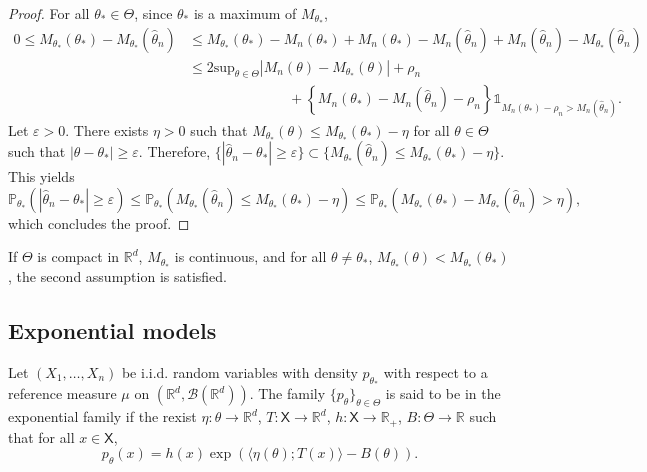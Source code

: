 \documentclass[english,graybox,envcountchap,envcountsame,sectrefs,shortlabels]{svmono}
\theoremstyle{style}
\newcommand{\eqsp}{}
\newcommand{\Xset}{\mathsf{X}}
\begin{document}
\begin{proof}
For all $\theta_*\in\Theta$, since $\theta_*$ is a maximum of $M_{\theta_*}$,
\begin{align*}
0\leq M_{\theta_*}(\theta_*) - M_{\theta_*}(\widehat\theta_n)&\leq  M_{\theta_*}(\theta_*) - M_n(\theta_*) + M_n(\theta_*) - M_n(\widehat\theta_n) + M_n(\widehat\theta_n) - M_{\theta_*}(\widehat\theta_n)\\
&\leq 2 \mathrm{sup}_{\theta\in\Theta}|M_n(\theta)-M_{\theta_*}(\theta)|+ \rho_n \\
&\hspace{3cm} + \left\{M_n(\theta_*)-M_n(\widehat \theta_n)-\rho_n\right\}\mathds{1}_{M_n(\theta_*) - \rho_n>M_n(\widehat \theta_n)}\eqsp.
\end{align*}
Let $\varepsilon>0$. There exists $\eta>0$ such that $M_{\theta_*}(\theta)\leq M_{\theta_*}(\theta_*)-\eta$ for all $\theta\in\Theta$ such that $|\theta-\theta_*|\geq \varepsilon$. Therefore, $\{|\widehat\theta_n-\theta_*|\geq \varepsilon\}\subset\{M_{\theta_*}(\widehat\theta_n)\leq M_{\theta_*}(\theta_*)-\eta\}$. This yields 
$$
\mathbb{P}_{\theta_*}\left(|\widehat\theta_n-\theta_*|\geq \varepsilon\right)\leq \mathbb{P}_{\theta_*}\left(M_{\theta_*}(\widehat\theta_n)\leq M_{\theta_*}(\theta_*)-\eta\right) \leq \mathbb{P}_{\theta_*}\left(M_{\theta_*}(\theta_*) - M_{\theta_*}(\widehat\theta_n)>\eta\right) \eqsp,
$$
which concludes the proof.
\end{proof}

\begin{remark}
If $\Theta$ is compact in $\mathbb{R}^d$, $M_{\theta_*}$ is continuous, and for all $\theta\neq\theta_*$, $M_{\theta_*}(\theta)<M_{\theta_*}(\theta_*)$, the second assumption is satisfied.
\end{remark}

\subsection{Exponential models}
Let $(X_1,\ldots,X_n)$ be i.i.d. random variables with density $p_{\theta_*}$ with respect to a reference measure $\mu$ on $(\mathbb{R}^d,\mathcal{B}(\mathbb{R}^d))$. The family $\{p_\theta\}_{\theta\in\Theta}$ is said to be in the exponential family if the rexist $\eta:\theta\to \mathbb{R}^d$, $T:\Xset\to\mathbb{R}^d$, $h:\Xset\to\mathbb{R}_+$, $B:\Theta\to\mathbb{R}$ such that for all $x\in\Xset$,
$$
p_\theta(x) = h(x)\exp\left(\langle \eta(\theta);T(x)\rangle - B(\theta)\right)\eqsp.
$$
\end{document}
